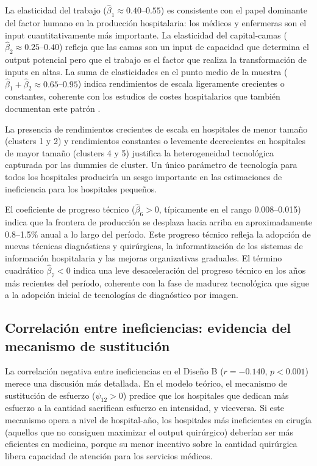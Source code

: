 La elasticidad del trabajo ($\hat{\beta}_1 \approx 0.40$--$0.55$) es consistente con el papel dominante del factor humano en la producción hospitalaria: los médicos y enfermeras son el input cuantitativamente más importante. La elasticidad del capital-camas ($\hat{\beta}_2 \approx 0.25$--$0.40$) refleja que las camas son un input de capacidad que determina el output potencial pero que el trabajo es el factor que realiza la transformación de inputs en altas. La suma de elasticidades en el punto medio de la muestra ($\hat{\beta}_1 + \hat{\beta}_2 \approx 0.65$--$0.95$) indica rendimientos de escala ligeramente crecientes o constantes, coherente con los estudios de costes hospitalarios que también documentan este patrón \citep{linna1998,farsi2005}.

La presencia de rendimientos crecientes de escala en hospitales de menor tamaño (clusters 1 y 2) y rendimientos constantes o levemente decrecientes en hospitales de mayor tamaño (clusters 4 y 5) justifica la heterogeneidad tecnológica capturada por las dummies de cluster. Un único parámetro de tecnología para todos los hospitales produciría un sesgo importante en las estimaciones de ineficiencia para los hospitales pequeños.

El coeficiente de progreso técnico ($\hat{\beta}_6 > 0$, típicamente en el rango 0.008--0.015) indica que la frontera de producción se desplaza hacia arriba en aproximadamente 0.8--1.5\% anual a lo largo del período. Este progreso técnico refleja la adopción de nuevas técnicas diagnósticas y quirúrgicas, la informatización de los sistemas de información hospitalaria y las mejoras organizativas graduales. El término cuadrático $\hat{\beta}_7 < 0$ indica una leve desaceleración del progreso técnico en los años más recientes del período, coherente con la fase de madurez tecnológica que sigue a la adopción inicial de tecnologías de diagnóstico por imagen.

\subsection{Correlación entre ineficiencias: evidencia del mecanismo de sustitución}

La correlación negativa entre ineficiencias en el Diseño B ($r=-0.140$, $p<0.001$) merece una discusión más detallada. En el modelo teórico, el mecanismo de sustitución de esfuerzo ($\psi_{12}>0$) predice que los hospitales que dedican más esfuerzo a la cantidad sacrifican esfuerzo en intensidad, y viceversa. Si este mecanismo opera a nivel de hospital-año, los hospitales más ineficientes en cirugía (aquellos que no consiguen maximizar el output quirúrgico) deberían ser más eficientes en medicina, porque su menor incentivo sobre la cantidad quirúrgica libera capacidad de atención para los servicios médicos.

